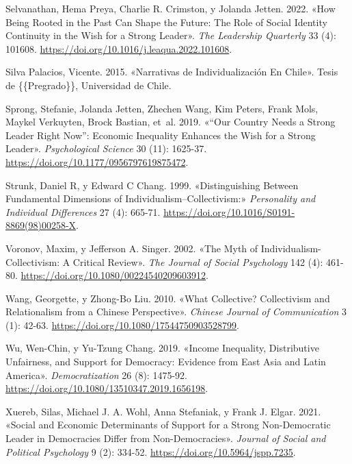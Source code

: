 \documentclass[
  letterpaper,
  DIV=11,
  numbers=noendperiod]{scrartcl}
\newlength{\cslhangindent}
\newenvironment{CSLReferences}[2] %
 {\begin{list}{}{%
  \setlength{\itemindent}{0pt}
  \setlength{\leftmargin}{0pt}
  \setlength{\parsep}{0pt}
  \ifodd #1
   \setlength{\leftmargin}{\cslhangindent}
   \setlength{\itemindent}{-1\cslhangindent}
  \fi
  \setlength{\itemsep}{#2\baselineskip}}}
 {\end{list}}
\begin{document}
\begin{CSLReferences}{1}{0}
Selvanathan, Hema Preya, Charlie R. Crimston, y Jolanda Jetten. 2022.
{«How Being Rooted in the Past Can Shape the Future: {The} Role of
Social Identity Continuity in the Wish for a Strong Leader»}. \emph{The
Leadership Quarterly} 33 (4): 101608.
\url{https://doi.org/10.1016/j.leaqua.2022.101608}.

Silva Palacios, Vicente. 2015. {«Narrativas de {Individualizaci{ó}n} En
{Chile}»}. Tesis de \{\{Pregrado\}\}, Universidad de Chile.

Sprong, Stefanie, Jolanda Jetten, Zhechen Wang, Kim Peters, Frank Mols,
Maykel Verkuyten, Brock Bastian, et~al. 2019. {«{``{Our Country Needs} a
{Strong Leader Right Now}''}: {Economic Inequality Enhances} the {Wish}
for a {Strong Leader}»}. \emph{Psychological Science} 30 (11): 1625-37.
\url{https://doi.org/10.1177/0956797619875472}.

Strunk, Daniel R, y Edward C Chang. 1999. {«Distinguishing Between
Fundamental Dimensions of Individualism--Collectivism:»}
\emph{Personality and Individual Differences} 27 (4): 665-71.
\url{https://doi.org/10.1016/S0191-8869(98)00258-X}.

Voronov, Maxim, y Jefferson A. Singer. 2002. {«The {Myth} of
{Individualism-Collectivism}: {A Critical Review}»}. \emph{The Journal
of Social Psychology} 142 (4): 461-80.
\url{https://doi.org/10.1080/00224540209603912}.

Wang, Georgette, y Zhong-Bo Liu. 2010. {«What Collective? {Collectivism}
and Relationalism from a {Chinese} Perspective»}. \emph{Chinese Journal
of Communication} 3 (1): 42-63.
\url{https://doi.org/10.1080/17544750903528799}.

Wu, Wen-Chin, y Yu-Tzung Chang. 2019. {«Income Inequality, Distributive
Unfairness, and Support for Democracy: Evidence from {East Asia} and
{Latin America}»}. \emph{Democratization} 26 (8): 1475-92.
\url{https://doi.org/10.1080/13510347.2019.1656198}.

Xuereb, Silas, Michael J. A. Wohl, Anna Stefaniak, y Frank J. Elgar.
2021. {«Social and Economic Determinants of Support for a Strong
Non-Democratic Leader in Democracies Differ from Non-Democracies»}.
\emph{Journal of Social and Political Psychology} 9 (2): 334-52.
\url{https://doi.org/10.5964/jspp.7235}.


\end{CSLReferences}
\end{document}

